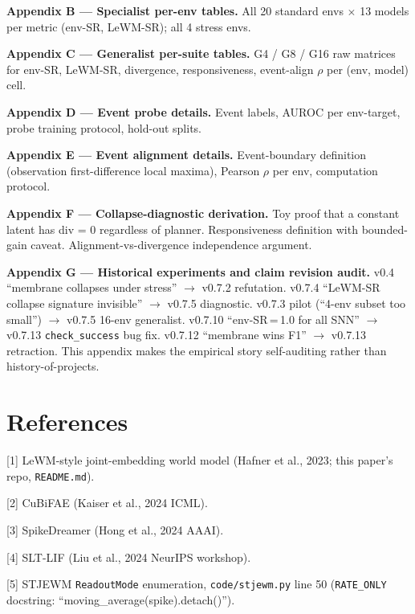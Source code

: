\documentclass{article}
\begin{document}
\textbf{Appendix B --- Specialist per-env tables.} All 20 standard
envs $\times$ 13 models per metric (env-SR, LeWM-SR); all 4 stress
envs.

\textbf{Appendix C --- Generalist per-suite tables.} G4 / G8 / G16
raw matrices for env-SR, LeWM-SR, divergence, responsiveness,
event-align $\rho$ per (env, model) cell.

\textbf{Appendix D --- Event probe details.} Event labels, AUROC per
env-target, probe training protocol, hold-out splits.

\textbf{Appendix E --- Event alignment details.} Event-boundary
definition (observation first-difference local maxima), Pearson
$\rho$ per env, computation protocol.

\textbf{Appendix F --- Collapse-diagnostic derivation.} Toy proof that
a constant latent has div = 0 regardless of planner. Responsiveness
definition with bounded-gain caveat. Alignment-vs-divergence
independence argument.

\textbf{Appendix G --- Historical experiments and claim revision
audit.} v0.4 ``membrane collapses under stress'' $\to$ v0.7.2
refutation. v0.7.4 ``LeWM-SR collapse signature invisible'' $\to$
v0.7.5 diagnostic. v0.7.3 pilot (``4-env subset too small'')
$\to$ v0.7.5 16-env generalist. v0.7.10 ``env-SR\,=\,1.0 for all SNN''
$\to$ v0.7.13 \texttt{check\_success} bug fix. v0.7.12 ``membrane wins
F1'' $\to$ v0.7.13 retraction. This appendix makes the empirical
story self-auditing rather than history-of-projects.

\section*{References}

\small
[1] LeWM-style joint-embedding world model (Hafner et al., 2023; this paper's repo, \texttt{README.md}).

[2] CuBiFAE (Kaiser et al., 2024 ICML).

[3] SpikeDreamer (Hong et al., 2024 AAAI).

[4] SLT-LIF (Liu et al., 2024 NeurIPS workshop).

[5] STJEWM \texttt{ReadoutMode} enumeration, \texttt{code/stjewm.py} line 50 (\texttt{RATE\_ONLY} docstring: ``moving\_average(spike).detach()'').
\end{document}
